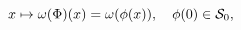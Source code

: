 \begin{equation}
x \mapsto \omega (\Phi) (x) = \omega (\phi(x)), \quad \phi(0) \in {\cal S}_0,
\end{equation}

